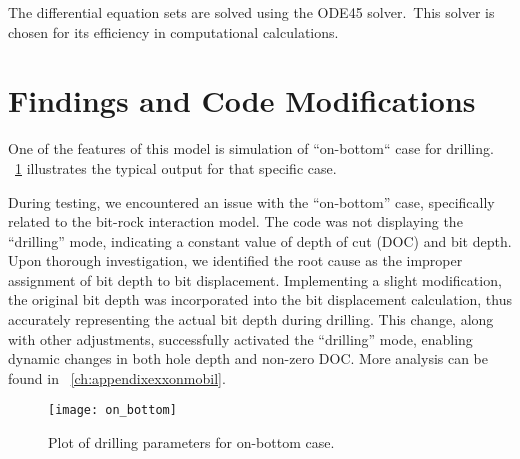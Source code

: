 \begin{mathwhere}[1.0in]
\end{mathwhere}

The differential equation sets are solved using the ODE45 solver.\ This solver is chosen for its efficiency in computational calculations.


\section{Findings and Code Modifications}
 
One of the features of this model is simulation of ``on-bottom`` case for drilling. \figurename~\ref{findings} illustrates the typical output for that specific case.

During testing, we encountered an issue with the ``on-bottom'' case, specifically related to the bit-rock interaction model. The code was not displaying the ``drilling'' mode, indicating a constant value of depth of cut (DOC) and bit depth. Upon thorough investigation, we identified the root cause as the improper assignment of bit depth to bit displacement. Implementing a slight modification, the original bit depth was incorporated into the bit displacement calculation, thus accurately representing the actual bit depth during drilling. This change, along with other adjustments, successfully activated the ``drilling'' mode, enabling dynamic changes in both hole depth and non-zero DOC. More analysis can be found in \appendixname~\ref{ch:appendixexxonmobil}. 

\begin{figure}
  \centering
  \texttt{[image: on\_bottom]}
  \caption[Plots of on-bottom case]{Plot of drilling parameters for on-bottom case.}\label{findings}
\end{figure}

